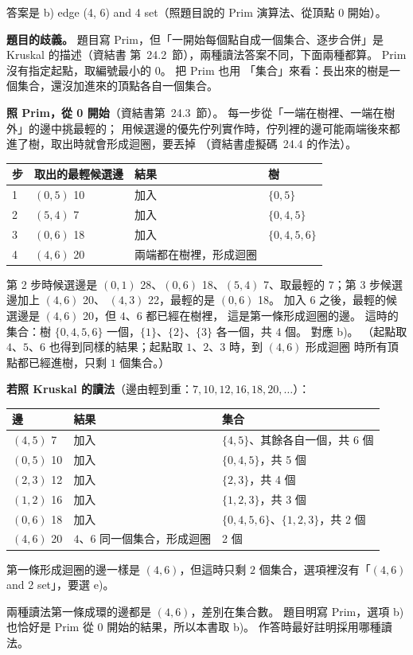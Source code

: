 \begin{pastsoln}
答案是 b) edge (4, 6) and 4 set（照題目說的 Prim 演算法、從頂點 0 開始）。

\textbf{題目的歧義。} 題目寫 Prim，但「一開始每個點自成一個集合、逐步合併」是 Kruskal 的描述（資結書
第~24.2~節），兩種讀法答案不同，下面兩種都算。 Prim 沒有指定起點，取編號最小的 $0$。 把 Prim 也用
「集合」來看：長出來的樹是一個集合，還沒加進來的頂點各自一個集合。

\textbf{照 Prim，從 0 開始}（資結書第~24.3~節）。 每一步從「一端在樹裡、一端在樹外」的邊中挑最輕的；
用候選邊的優先佇列實作時，佇列裡的邊可能兩端後來都進了樹，取出時就會形成迴圈，要丟掉
（資結書虛擬碼~24.4 的作法）。
\begin{center}
\small
\begin{tabular}{llll}
\toprule
步 & 取出的最輕候選邊 & 結果 & 樹 \\
\midrule
1 & $(0, 5)$ 10 & 加入 & $\{0, 5\}$ \\
2 & $(5, 4)$ 7 & 加入 & $\{0, 4, 5\}$ \\
3 & $(0, 6)$ 18 & 加入 & $\{0, 4, 5, 6\}$ \\
4 & $(4, 6)$ 20 & 兩端都在樹裡，形成迴圈 & \\
\bottomrule
\end{tabular}
\end{center}
第 2 步時候選邊是 $(0, 1)$ 28、$(0, 6)$ 18、$(5, 4)$ 7、取最輕的 $7$；第 3 步候選邊加上 $(4, 6)$ 20、
$(4, 3)$ 22，最輕的是 $(0, 6)$ 18。 加入 $6$ 之後，最輕的候選邊是 $(4, 6)$ 20，但 $4$、$6$ 都已經在樹裡，
這是第一條形成迴圈的邊。 這時的集合：樹 $\{0, 4, 5, 6\}$ 一個，$\{1\}$、$\{2\}$、$\{3\}$ 各一個，共
$4$ 個。 對應 b)。 （起點取 $4$、$5$、$6$ 也得到同樣的結果；起點取 $1$、$2$、$3$ 時，到 $(4, 6)$ 形成迴圈
時所有頂點都已經進樹，只剩 $1$ 個集合。）

\textbf{若照 Kruskal 的讀法}（邊由輕到重：$7, 10, 12, 16, 18, 20, \dots$）：
\begin{center}
\small
\begin{tabular}{lll}
\toprule
邊 & 結果 & 集合 \\
\midrule
$(4, 5)$ 7 & 加入 & $\{4, 5\}$、其餘各自一個，共 6 個 \\
$(0, 5)$ 10 & 加入 & $\{0, 4, 5\}$，共 5 個 \\
$(2, 3)$ 12 & 加入 & $\{2, 3\}$，共 4 個 \\
$(1, 2)$ 16 & 加入 & $\{1, 2, 3\}$，共 3 個 \\
$(0, 6)$ 18 & 加入 & $\{0, 4, 5, 6\}$、$\{1, 2, 3\}$，共 2 個 \\
$(4, 6)$ 20 & $4$、$6$ 同一個集合，形成迴圈 & 2 個 \\
\bottomrule
\end{tabular}
\end{center}
第一條形成迴圈的邊一樣是 $(4, 6)$，但這時只剩 $2$ 個集合，選項裡沒有「$(4, 6)$ and 2 set」，要選 e)。

兩種讀法第一條成環的邊都是 $(4, 6)$，差別在集合數。 題目明寫 Prim，選項 b) 也恰好是 Prim 從 $0$
開始的結果，所以本書取 b)。 作答時最好註明採用哪種讀法。
\end{pastsoln}
